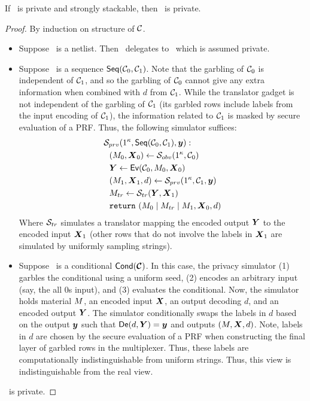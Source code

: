 \begin{theorem}
  If \underscheme\ is private and strongly stackable, then \ourscheme\ is private.
\end{theorem}
\begin{proof}
  By induction on structure of $\mathcal C$.
  \begin{itemize}
    \item Suppose \cir\ is a netlist. Then \ourscheme\ delegates to
      \underscheme\ which is assumed private.
    \item Suppose \cir\ is a sequence $\textsf{Seq}(\mathcal C_0, \mathcal C_1)$.
      Note that the garbling of $\mathcal C_0$ is independent of
      $\mathcal C_1$, and so the garbling of $\mathcal C_0$ cannot give any extra information when combined
      with $d$ from $\mathcal C_1$.
      While the translator gadget is not independent of the garbling
      of $\mathcal C_1$ (its garbled rows include labels from the input
      encoding of $\mathcal C_1$), the information related to $\mathcal C_1$ is
      masked by secure evaluation of a PRF.
      Thus, the following simulator suffices:
      \begin{align*}
        &\simulator_{prv}(1^\kappa, \sequential(\cir_0, \cir_1), \cirout):\\
        &~~(\mat_0, \gcirinp_0) \gets \simulator_{obv}(1^\kappa, \cir_0)\\
        &~~\gcirout \gets \gEv(\cir_0, \mat_0, \gcirinp_0)\\
        &~~(\mat_1, \gcirinp_1, d) \gets \simulator_{prv}(1^\kappa, \cir_1, \cirout)\\
        &~~\mat_{tr} \gets \simulator_{tr}(\gcirout, \gcirinp_1)\\
        &~~\creturn~(\mat_0 \mid \mat_{tr} \mid \mat_1, \gcirinp_0, d)
      \end{align*}
      Where $\mathcal{S}_{tr}$ simulates a translator
      mapping the encoded output $\gcirout$ to the encoded input
      $\gcirinp_1$ (other rows that do not involve the labels in
      $\gcirinp_1$ are simulated by uniformly sampling strings).
    \item Suppose \cir\ is a conditional $\conditional(\vec \cir)$.
      In this case, the privacy simulator (1) garbles the conditional
      using a uniform seed, (2) encodes an arbitrary input (say, the
      all 0s input), and (3) evaluates the conditional.
      Now, the simulator holds material $M$, an encoded input
      $\gcirinp$, an output decoding $d$, and an encoded output
      $\gcirout$.
      The simulator conditionally swaps the labels in $d$ based on the
      output $\cirout$ such that $\gDe(d, \gcirout) = \cirout$ and
      outputs $(\mat, \gcirinp, d)$.
      Note, labels in $d$ are chosen by the secure evaluation of a PRF
      when constructing the final layer of garbled rows in the multiplexer.
      Thus, these labels are computationally indistinguishable from
      uniform strings.
      Thus, this view is indistinguishable from the real view.
  \end{itemize}
  \ourscheme\ is private.
\end{proof}

